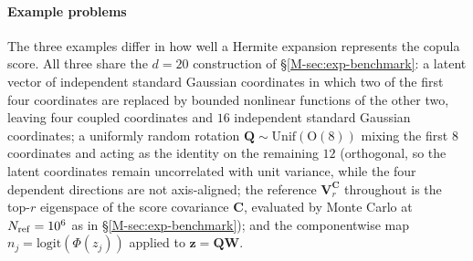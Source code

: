 \documentclass[supplement,review,hidelinks,onefignum,onetabnum]{siamart251216}
\newcommand{\mC}{\bm{C}}
\newcommand{\mV}{\bm{V}}
\newcommand{\mQ}{\bm{Q}}
\newcommand{\vz}{\bm{z}}
\newcommand{\vW}{\bm{W}}
\begin{document}
\paragraph{Example problems} The three examples differ in how well a Hermite expansion represents the copula score. All three share the $d=20$ construction of \S\ref{M-sec:exp-benchmark}: a latent vector of independent standard Gaussian coordinates in which two of the first four coordinates are replaced by bounded nonlinear functions of the other two, leaving four coupled coordinates and $16$ independent standard Gaussian coordinates; a uniformly random rotation $\mQ \sim \mathrm{Unif}(\mathrm{O}(8))$ mixing the first $8$ coordinates and acting as the identity on the remaining $12$ (orthogonal, so the latent coordinates remain uncorrelated with unit variance, while the four dependent directions are not axis-aligned; the reference $\mV_r^{\mC}$ throughout is the top-$r$ eigenspace of the score covariance $\mC$, evaluated by Monte Carlo at $N_{\rm ref} = 10^6$ as in \S\ref{M-sec:exp-benchmark}); and the componentwise map $n_j = \mathrm{logit}(\Phi(z_j))$ applied to $\vz = \mQ\vW$.
\end{document}
